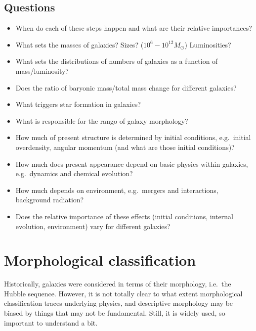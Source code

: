 \documentclass{article}
\begin{document}
\subsection{Questions}
\begin{itemize}
    \item When do each of these steps happen and what are their
        relative importances?
    \item What sets the masses of galaxies? Sizes?
        ($10^6-10^{12}M_\odot$) Luminosities?
    \item What sets the distributions of numbers of galaxies as a
        function of mass/luminosity?
    \item Does the ratio of baryonic mass/total mass change for
        different galaxies?
    \item What triggers star formation in galaxies?
    \item What is responsible for the rango of galaxy morphology?
    \item How much of present structure is determined by initial
        conditions, e.g.\ initial overdensity, angular momentum (and what
        are those initial conditions)?
    \item How much does present appearance depend on basic physics
        within galaxies, e.g.\ dynamics and chemical evolution?
    \item How much depends on environment, e.g.\ mergers and
        interactions, background radiation?
    \item Does the relative importance of these effects (initial
        conditions, internal evolution, environment) vary for different
        galaxies?
\end{itemize}
\newpage

\section{Morphological classification}
Historically, galaxies were considered in terms of their morphology, i.e.\ the
Hubble sequence.  However, it is not totally clear to what extent morphological
classification traces underlying physics, and descriptive morphology may be
biased by things that may not be fundamental.  Still, it is widely used, so
important to understand a bit.
\end{document}
